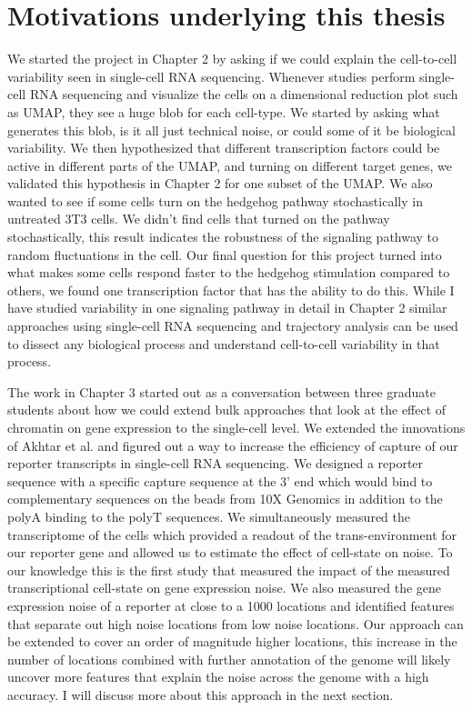 \section{Motivations underlying this thesis}

We started the project in Chapter 2 by asking if we could explain the cell-to-cell variability seen in single-cell RNA sequencing. Whenever studies perform single-cell RNA sequencing and visualize the cells on a dimensional reduction plot such as UMAP, they see a huge blob for each cell-type. We started by asking what generates this blob, is it all just technical noise, or could some of it be biological variability. We then hypothesized that different transcription factors could be active in different parts of the UMAP, and turning on different target genes, we validated this hypothesis in Chapter 2 for one subset of the UMAP. We also wanted to see if some cells turn on the hedgehog pathway stochastically in untreated 3T3 cells. We didn't find cells that turned on the pathway stochastically, this result indicates the robustness of the signaling pathway to random fluctuations in the cell. Our final question for this project turned into what makes some cells respond faster to the hedgehog stimulation compared to others, we found one transcription factor that has the ability to do this. While I have studied variability in one signaling pathway in detail in Chapter 2 similar approaches using single-cell RNA sequencing and trajectory analysis can be used to dissect any biological process and understand cell-to-cell variability in that process.

The work in Chapter 3 started out as a conversation between three graduate students about how we could extend bulk approaches that look at the effect of chromatin on gene expression to the single-cell level. We extended the innovations of Akhtar et al. \cite{akhtarw_vansteenselb:ChromatinPosition2013} and figured out a way to increase the efficiency of capture of our reporter transcripts in single-cell RNA sequencing. We designed a reporter sequence with a specific capture sequence at the 3' end which would bind to complementary sequences on the beads from 10X Genomics in addition to the polyA binding to the polyT sequences. We simultaneously measured the transcriptome of the cells which provided a readout of the trans-environment for our reporter gene and allowed us to estimate the effect of cell-state on noise. To our knowledge this is the first study that measured the impact of the measured transcriptional cell-state on gene expression noise. We also measured the gene expression noise of a reporter at close to a 1000 locations and identified features that separate out high noise locations from low noise locations. Our approach can be extended to cover an order of magnitude higher locations, this increase in the number of locations combined with further annotation of the genome will likely uncover more features that explain the noise across the genome with a high accuracy. I will discuss more about this approach in the next section.

